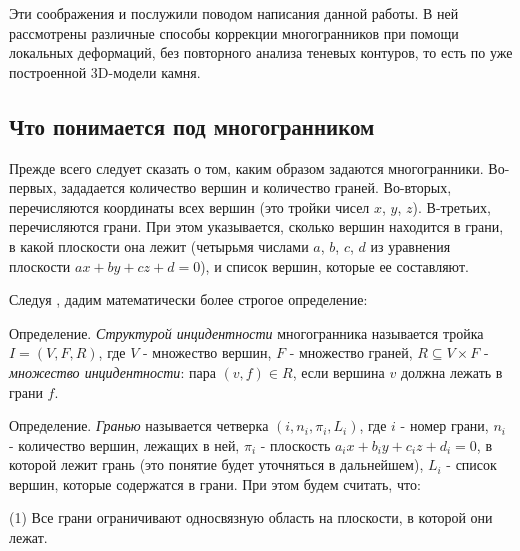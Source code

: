 \documentclass[a4paper,12pt, titlepage]{article}
\begin{document}
\begin{flushleft}
  Эти соображения и послужили поводом написания данной работы. В ней рассмотрены различные способы коррекции
многогранников при помощи локальных деформаций, без повторного анализа теневых контуров, то есть по уже 
построенной 3D-модели камня.
\end{flushleft}

\subsection{Что понимается под многогранником}
\begin{flushleft}
 Прежде всего следует сказать о том, каким образом задаются многогранники. Во-первых, зададается 
количество вершин и количество граней. Во-вторых, перечисляются координаты всех вершин (это тройки
чисел $x$, $y$, $z$). В-третьих, перечисляются грани. При этом указывается, сколько вершин находится в
грани, в какой плоскости она лежит (четырьмя числами $a$, $b$, $c$, $d$ из уравнения плоскости 
$a x + b y + c z + d = 0$), и список вершин, которые ее составляют.
\end{flushleft}

\begin{flushleft}
 Следуя \cite{Ros-Thomas, CD87}, дадим математически более строгое определение:
\end{flushleft}
\begin{flushleft}
 Определение. \textit{Структурой инцидентности} многогранника называется тройка $I = (V, F, R)$, 
где $V$ - множество вершин, $F$ - множество граней, $R \subseteq V \times F$ - \textit{множество инцидентности}:
пара $(v, f) \in R$, если вершина $v$ должна лежать в грани $f$.
\end{flushleft}

\begin{flushleft}
 Определение. \textit{Гранью} называется четверка $(i, n_{i}, \pi_{i}, L_{i})$, где $i$ - номер грани, $n_{i}$ - 
количество вершин, лежащих в ней, $\pi_{i}$ - плоскость $a_{i}x + b_{i}y + c_{i}z + d_{i} = 0$, 
в которой лежит грань (это понятие будет уточняться в дальнейшем), $L_{i}$ - список вершин, 
которые содержатся в грани. При этом будем считать, что:
\end{flushleft}

\begin{flushleft}
 (1) Все грани ограничивают односвязную область на плоскости, в которой они лежат.
\end{flushleft}
\end{document}
